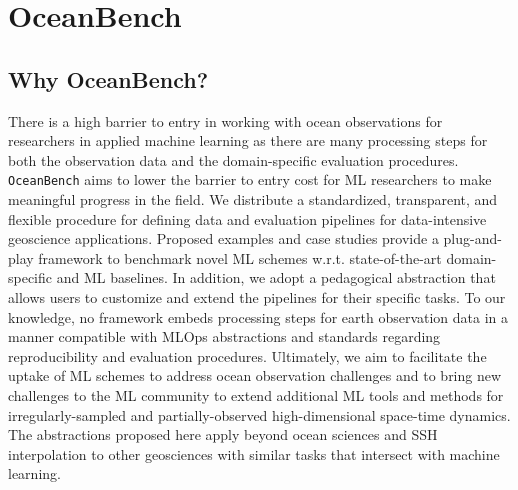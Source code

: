 \section{OceanBench} \label{sec:oceanbench_intro}

\subsection{Why OceanBench?} \label{sec:oceanbench_why}

There is a high barrier to entry in working with ocean observations for researchers in applied machine learning as there are many processing steps for both the observation data and the domain-specific evaluation procedures. 
\texttt{OceanBench} aims to lower the barrier to entry cost for ML researchers to make meaningful progress in the field. 
We distribute a standardized, transparent, and flexible procedure for defining data and evaluation pipelines for data-intensive geoscience applications. 
Proposed examples and case studies provide a plug-and-play framework to benchmark novel ML schemes w.r.t.  state-of-the-art domain-specific and ML baselines. 
In addition, we adopt a pedagogical abstraction that allows users to customize and extend the pipelines for their specific tasks.
To our knowledge, no framework embeds processing steps for earth observation data in a manner compatible with MLOps abstractions and standards regarding reproducibility and evaluation procedures. 
Ultimately, we aim to facilitate the uptake of ML schemes to address ocean observation challenges and to bring new challenges to the ML community to extend additional ML tools and methods for irregularly-sampled and partially-observed high-dimensional space-time dynamics.
The abstractions proposed here apply beyond ocean sciences and SSH interpolation to other geosciences with similar tasks that intersect with machine learning.




